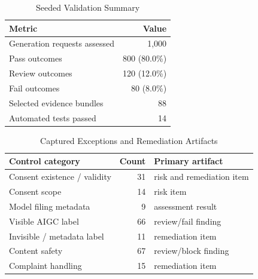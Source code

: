 \begin{table}[H]
\centering
\caption{Seeded Validation Summary}
\label{tab:validation-summary}
\footnotesize
\begin{tabular}{@{}lr@{}}
\toprule
Metric & Value \\
\midrule
Generation requests assessed & 1,000 \\
Pass outcomes & 800 (80.0\%) \\
Review outcomes & 120 (12.0\%) \\
Fail outcomes & 80 (8.0\%) \\
Selected evidence bundles & 88 \\
Automated tests passed & 14 \\
\bottomrule
\end{tabular}
\end{table}

\begin{table}[H]
\centering
\caption{Captured Exceptions and Remediation Artifacts}
\label{tab:exception-types}
\scriptsize
\begin{tabularx}{\columnwidth}{@{}p{} r X@{}}
\toprule
Control category & Count & Primary artifact \\
\midrule
Consent existence / validity & 31 & risk and remediation item \\
Consent scope & 14 & risk item \\
Model filing metadata & 9 & assessment result \\
Visible AIGC label & 66 & review/fail finding \\
Invisible / metadata label & 11 & remediation item \\
Content safety & 67 & review/block finding \\
Complaint handling & 15 & remediation item \\
\bottomrule
\end{tabularx}
\end{table}
